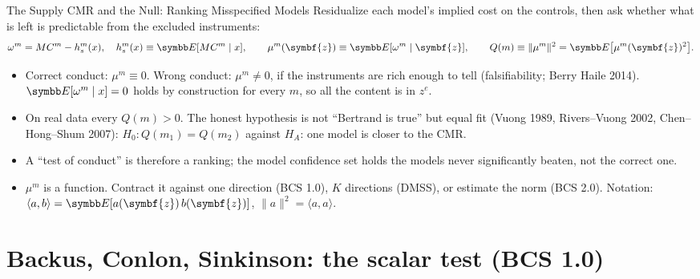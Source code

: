 \documentclass[aspectratio=169,10pt]{beamer}
\begin{document}
\begin{frame}{The Supply CMR and the Null: Ranking Misspecified Models}
\small
Residualize each model's implied cost on the controls, then ask whether what is left is predictable from the excluded instruments:
\begin{align*}
\omega^m = MC^m - h_s^m(x), \quad h_s^m(x) \equiv \E[MC^m \mid x],
\qquad
\mu^m(\symbf{z}) \equiv \E[\omega^m \mid \symbf{z}],
\qquad
Q(m) \equiv \|\mu^m\|^2 = \E\big[\mu^m(\symbf{z})^2\big] .
\end{align*}
\begin{itemize}
\item Correct conduct: $\mu^m \equiv 0$. Wrong conduct: $\mu^m \neq 0$, \alert{if} the instruments are rich enough to tell (falsifiability; Berry Haile 2014). $\E[\omega^m \mid x] = 0$ holds by construction for every $m$, so all the content is in $z^e$.
\item On real data every $Q(m) > 0$. The honest hypothesis is not ``Bertrand is true'' but \alert{equal fit} (Vuong 1989, Rivers--Vuong 2002, Chen--Hong--Shum 2007):
$H_0: Q(m_1) = Q(m_2)$ against $H_A$: one model is closer to the CMR.
\item A ``test of conduct'' is therefore a \alert{ranking}; the model confidence set holds the models never significantly beaten, not the correct one.
\item $\mu^m$ is a function. Contract it against one direction (BCS 1.0), $K$ directions (DMSS), or estimate the norm (BCS 2.0). Notation: $\langle a, b \rangle = \E[a(\symbf{z})\, b(\symbf{z})]$, $\|a\|^2 = \langle a, a \rangle$.
\end{itemize}
\end{frame}


\section{Backus, Conlon, Sinkinson: the scalar test (BCS 1.0)}
\end{document}
